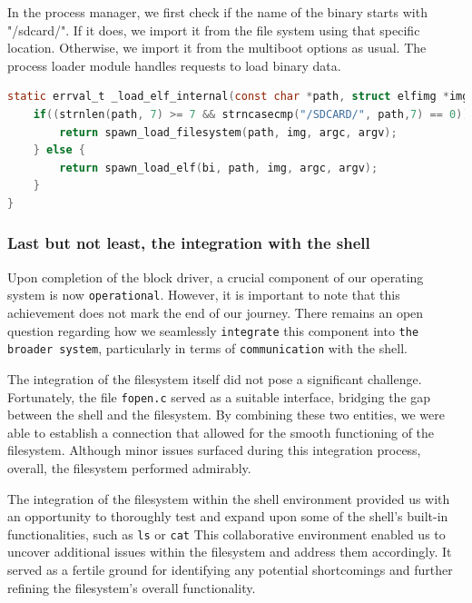 {In the process manager, we first check if the name of the binary starts with "/sdcard/". If it does, we import it from the file system using that specific location. Otherwise, we import it from the multiboot options as usual. The process loader module  handles requests to load binary data.

\begin{lstlisting}[caption={Routing the load request to the correct source},captionpos=b,language=C,frame=single,breaklines]
static errval_t _load_elf_internal(const char *path, struct elfimg *img, int *argc, char ***argv) {
    if((strnlen(path, 7) >= 7 && strncasecmp("/SDCARD/", path,7) == 0)) {
        return spawn_load_filesystem(path, img, argc, argv);
    } else {
        return spawn_load_elf(bi, path, img, argc, argv);
    }
}
\end{lstlisting}

\subsubsection{Last but not least, the integration with the shell}

Upon completion of the block driver, a crucial component of our operating system is now \texttt{operational}. However, it is important to note that this achievement does not mark the end of our journey. There remains an open question regarding how we seamlessly \texttt{integrate} this component into \texttt{the broader system}, particularly in terms of \texttt{communication} with the shell.

The integration of the filesystem itself did not pose a significant challenge. Fortunately, the file \texttt{fopen.c} served as a suitable interface, bridging the gap between the shell and the filesystem. By combining these two entities, we were able to establish a connection that allowed for the smooth functioning of the filesystem. Although minor issues surfaced during this integration process, overall, the filesystem performed admirably.

The integration of the filesystem within the shell environment provided us with an opportunity to thoroughly test and expand upon some of the shell's built-in functionalities, such as \texttt{ls} or \texttt{cat} This collaborative environment enabled us to uncover additional issues within the filesystem and address them accordingly. It served as a fertile ground for identifying any potential shortcomings and further refining the filesystem's overall functionality.

}
